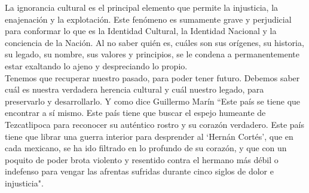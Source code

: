 La ignorancia cultural es el principal elemento que permite la injusticia, la enajenación y la explotación. Este fenómeno es sumamente grave y perjudicial para conformar lo que es la Identidad Cultural, la Identidad Nacional y la conciencia de la Nación. Al no saber quién es, cuáles son sus orígenes, su historia, su legado, su nombre, sus valores y principios, se le condena a permanentemente estar exaltando lo ajeno y despreciando lo propio.
\\[1pt]


Tenemos que recuperar nuestro pasado, para poder tener futuro. Debemos saber cuál es nuestra verdadera herencia cultural y cuál nuestro legado, para preservarlo y desarrollarlo. Y como dice Guillermo Marín \cite{pp07} ``Este país se tiene que encontrar a sí mismo. Este país tiene que buscar el espejo humeante de Tezcatlipoca para reconocer su auténtico rostro y su corazón verdadero. Este país tiene que librar una guerra interior para desprender al `Hernán Cortés', que en cada mexicano, se ha ido filtrado en lo profundo de su corazón, y que con un poquito de poder brota violento y resentido contra el hermano más débil o indefenso para vengar las afrentas sufridas durante cinco siglos de dolor e injusticia".
\\[1pt]
